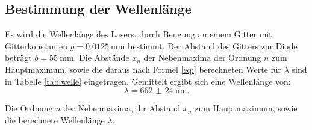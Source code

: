 \subsection{Bestimmung der Wellenlänge}

Es wird die Wellenlänge des Lasers, durch Beugung an einem Gitter mit Gitterkonstanten $g=\SI{0.0125}{\milli\metre}$ bestimmt. Der Abstand des Gitters zur Diode beträgt $b=\SI{55}{\milli\metre}$. Die Abstände $x_n$ der Nebenmaxima der Ordnung $n$ zum Hauptmaximum, sowie die daraus nach Formel \eqref{eq:} berechneten Werte für $\lambda$ sind in Tabelle \ref{tab:welle} eingetragen.
Gemittelt ergibt sich eine Wellenlänge von:
\[
\lambda = \SI{662(24)}{\nano\metre} \text{.}
\] 

\begin{table}
	\centering
	\caption{Die Ordnung $n$ der Nebenmaxima, ihr Abstand $x_n$ zum Hauptmaximum, sowie die berechnete Wellenlänge $\lambda$.}
	
	\label{tab:welle}
\end{table}